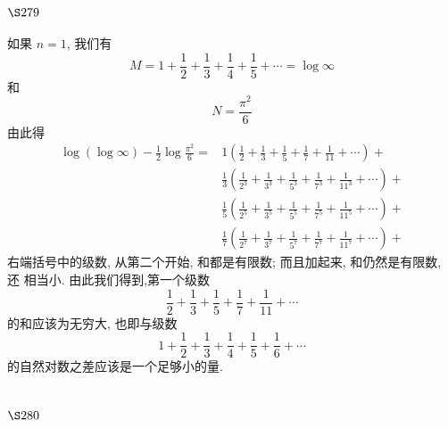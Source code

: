 \section{$\S 279$}

如果 $n=1$, 我们有
\[
M=1+\frac{1}{2}+\frac{1}{3}+\frac{1}{4}+\frac{1}{5}+\cdots=\log \infty
\]
和
\[
N=\frac{\pi^{2}}{6}
\]
由此得
\[
\begin{aligned}
\log (\log \infty)-\frac{1}{2} \log \frac{\pi^{2}}{6}= & 1\left(\frac{1}{2}+\frac{1}{3}+\frac{1}{5}+\frac{1}{7}+\frac{1}{11}+\cdots\right)+ \\
& \frac{1}{3}\left(\frac{1}{2^{3}}+\frac{1}{3^{3}}+\frac{1}{5^{3}}+\frac{1}{7^{3}}+\frac{1}{11^{3}}+\cdots\right)+ \\
& \frac{1}{5}\left(\frac{1}{2^{5}}+\frac{1}{3^{5}}+\frac{1}{5^{5}}+\frac{1}{7^{5}}+\frac{1}{11^{5}}+\cdots\right)+ \\
& \frac{1}{7}\left(\frac{1}{2^{7}}+\frac{1}{3^{7}}+\frac{1}{5^{7}}+\frac{1}{7^{7}}+\frac{1}{11^{7}}+\cdots\right)+
\end{aligned}
\]
右端括号中的级数, 从第二个开始, 和都是有限数; 而且加起来, 和仍然是有限数, 还 相当小. 由此我们得到,第一个级数
\[
\frac{1}{2}+\frac{1}{3}+\frac{1}{5}+\frac{1}{7}+\frac{1}{11}+\cdots
\]
的和应该为无穷大, 也即与级数
\[
1+\frac{1}{2}+\frac{1}{3}+\frac{1}{4}+\frac{1}{5}+\frac{1}{6}+\cdots
\]
的自然对数之差应该是一个足够小的量.

\section{$\S 280$}

